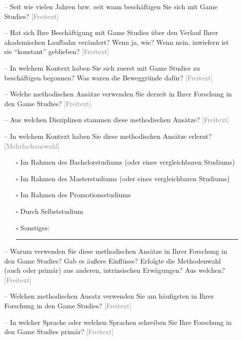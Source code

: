 \documentclass{scrartcl}
\begin{document}
\begin{itemize}
   \item[--] Seit wie vielen Jahren bzw. seit wann beschäftigen Sie sich mit Game Studies? \textcolor{gray}{\textsf{[Freitext]}}
   \item[--] Hat sich Ihre Beschäftigung mit Game Studies über den Verlauf Ihrer akademischen Laufbahn verändert? Wenn ja, wie? Wenn nein, inwiefern ist sie \enquote{konstant} geblieben? \textcolor{gray}{\textsf{[Freitext]}}
   \item[--] In welchem Kontext haben Sie sich zuerst mit Game Studies zu beschäftigen begonnen? Was waren die Beweggründe dafür? \textcolor{gray}{\textsf{[Freitext]}}
   \item[--] Welche methodischen Ansätze verwenden Sie derzeit in Ihrer Forschung in den Game Studies? \textcolor{gray}{\textsf{[Freitext]}}
   \item[--] Aus welchen Disziplinen stammen diese methodischen Ansätze? \textcolor{gray}{\textsf{[Freitext]}}
   \item[--] In welchem Kontext haben Sie diese methodischen Ansätze erlernt? \textcolor{gray}{\textsf{[Mehrfachauswahl]}}
   \begin{itemize}
      \item[$\square$] Im Rahmen des Bachelorstudiums (oder eines vergleichbaren Studiums)
      \item[$\square$] Im Rahmen des Masterstudiums (oder eines vergleichbaren Studiums)
      \item[$\square$] Im Rahmen des Promotionsstudiums
      \item[$\square$] Durch Selbststudium
      \item[$\square$] Sonstiges:\ \rule{2cm}{0.4pt}
   \end{itemize}
   \item[--] Warum verwenden Sie diese methodischen Ansätze in Ihrer Forschung in den Game Studies? Gab es äußere Einflüsse? Erfolgte die Methodenwahl (auch oder primär) aus anderen, intrinsischen Erwägungen? Aus welchen? \textcolor{gray}{\textsf{[Freitext]}}
   \item[--] Welchen methodischen Ansatz verwenden Sie am häufigsten in Ihrer Forschung in den Game Studies? \textcolor{gray}{\textsf{[Freitext]}}
   \item[--] In welcher Sprache oder welchen Sprachen schreiben Sie Ihre Forschung in den Game Studies primär? \textcolor{gray}{\textsf{[Freitext]}}
\end{itemize}
\end{document}
